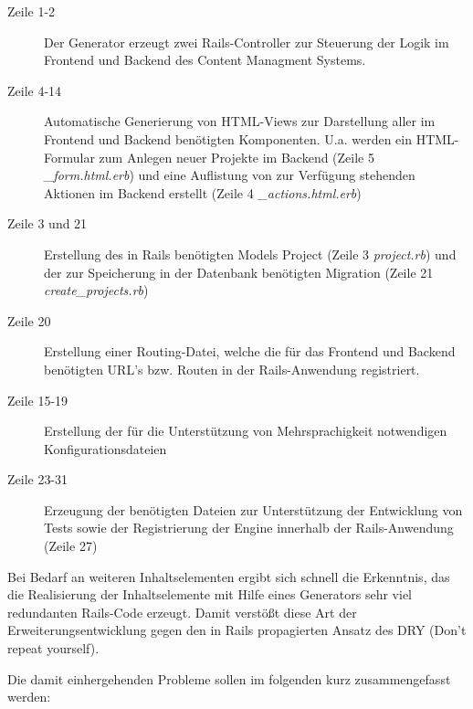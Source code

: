 \begin{description}
\item[Zeile 1-2]
Der Generator erzeugt zwei Rails-Controller zur Steuerung der Logik im Frontend und Backend des Content Managment Systems.
\item[Zeile 4-14]
Automatische Generierung von HTML-Views zur Darstellung aller im Frontend und Backend benötigten Komponenten. U.a. werden ein HTML-Formular zum Anlegen neuer Projekte im Backend (Zeile 5 \emph{\_form.html.erb}) und eine Auflistung von zur Verfügung stehenden Aktionen im Backend erstellt (Zeile 4 \emph{\_actions.html.erb})
\item[Zeile 3 und 21]
Erstellung des in Rails benötigten Models Project (Zeile 3 \emph{project.rb}) und der zur Speicherung in der Datenbank benötigten Migration (Zeile 21 \emph{create\_projects.rb})
\item[Zeile 20]
Erstellung einer Routing-Datei, welche die für das Frontend und Backend benötigten URL's bzw. Routen in der Rails-Anwendung registriert.
\item[Zeile 15-19]
Erstellung der für die Unterstützung von Mehrsprachigkeit notwendigen Konfigurationsdateien
\item[Zeile 23-31]
Erzeugung der benötigten Dateien zur Unterstützung der Entwicklung von Tests sowie der Registrierung der Engine innerhalb der Rails-Anwendung (Zeile 27)
\end{description}



Bei Bedarf an weiteren Inhaltselementen ergibt sich schnell die Erkenntnis, das die Realisierung der Inhaltselemente mit Hilfe eines Generators sehr viel redundanten Rails-Code erzeugt. Damit verstößt diese Art der Erweiterungsentwicklung gegen den in Rails propagierten Ansatz des DRY (Don't repeat yourself).

Die damit einhergehenden Probleme sollen im folgenden kurz zusammengefasst werden:



